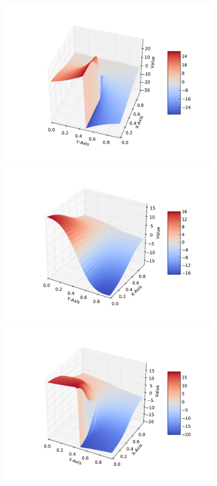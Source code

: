 \begin{figure}[!htb]
    \includegraphics[width=\linewidth]{figs/chap4/atan.pdf}
  \endminipage\hfill
    \includegraphics[width=\linewidth]{figs/chap4/atan3s.pdf}
  \endminipage
    \includegraphics[width=\linewidth]{figs/chap4/atan3e.pdf}

\end{figure}
